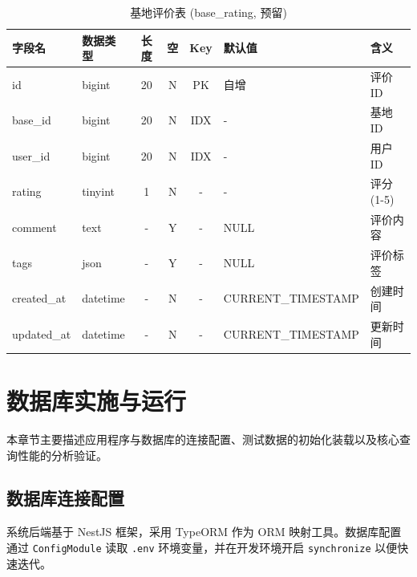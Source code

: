 \documentclass[UTF8,a4paper,12pt]{article}
\begin{document}
\begin{table}[H]
    \centering
    \caption{基地评价表 (base\_rating, 预留)}
    \label{tab:base_rating}
    \small
    \renewcommand{\arraystretch}{1.3}
    \begin{tabular}{|l|l|c|c|c|l|l|}
        \hline
        \rowcolor{gray!15} \textbf{字段名} & \textbf{数据类型} & \textbf{长度} & \textbf{空} & \textbf{Key} & \textbf{默认值} & \textbf{含义} \\ \hline
        id & bigint & 20 & N & PK & 自增 & 评价ID \\ \hline
        base\_id & bigint & 20 & N & IDX & - & 基地ID \\ \hline
        user\_id & bigint & 20 & N & IDX & - & 用户ID \\ \hline
        rating & tinyint & 1 & N & - & - & 评分(1-5) \\ \hline
        comment & text & - & Y & - & NULL & 评价内容 \\ \hline
        tags & json & - & Y & - & NULL & 评价标签 \\ \hline
        created\_at & datetime & - & N & - & CURRENT\_TIMESTAMP & 创建时间 \\ \hline
        updated\_at & datetime & - & N & - & CURRENT\_TIMESTAMP & 更新时间 \\ \hline
    \end{tabular}
\end{table}

\section{数据库实施与运行}

本章节主要描述应用程序与数据库的连接配置、测试数据的初始化装载以及核心查询性能的分析验证。

\subsection{数据库连接配置}
系统后端基于 NestJS 框架，采用 TypeORM 作为 ORM 映射工具。数据库配置通过 \texttt{ConfigModule} 读取 \texttt{.env} 环境变量，并在开发环境开启 \texttt{synchronize} 以便快速迭代。
\end{document}

